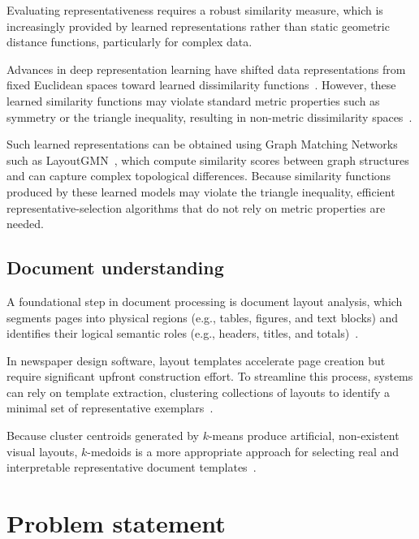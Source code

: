 \documentclass{ieeeaccess}
\begin{document}
Evaluating representativeness requires a robust similarity measure, which is increasingly provided by learned representations rather than static geometric distance functions, particularly for complex data.

Advances in deep representation learning have shifted data representations from fixed Euclidean spaces toward learned dissimilarity functions~\cite{kayabilge2019deeplearningsurvey}. However, these learned similarity functions may violate standard metric properties such as symmetry or the triangle inequality, resulting in non-metric dissimilarity spaces~\cite{skopal2007nonmetricsimilarity}.

Such learned representations can be obtained using Graph Matching Networks such as LayoutGMN~\cite{patil2021layoutgmn}, which compute similarity scores between graph structures and can capture complex topological differences. Because similarity functions produced by these learned models may violate the triangle inequality, efficient representative-selection algorithms that do not rely on metric properties are needed.

\subsection{Document understanding}

A foundational step in document processing is document layout analysis, which segments pages into physical regions (e.g., tables, figures, and text blocks) and identifies their logical semantic roles (e.g., headers, titles, and totals)~\cite{shen2021layoutparser,pfitzmann2022doclaynet}.

In newspaper design software, layout templates accelerate page creation but require significant upfront construction effort. To streamline this process, systems can rely on template extraction, clustering collections of layouts to identify a minimal set of representative exemplars~\cite{binmakhasen2020doclayoutanalysis}.

Because cluster centroids generated by $k$-means produce artificial, non-existent visual layouts, $k$-medoids is a more appropriate approach for selecting real and interpretable representative document templates~\cite{kaufman1987clustering}.

\section{Problem statement}
\label{sec:problem-statement}
\end{document}
